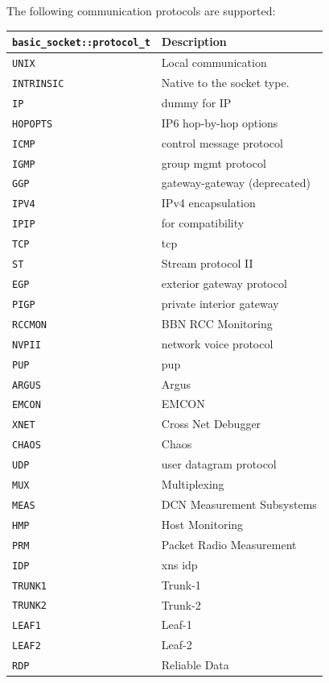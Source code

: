 \documentclass[10pt,a4paper,openany]{mudbook}
\begin{document}
The following communication protocols are supported:
\begin{longtable}{l|p{}}
  \textbf{\texttt{basic\_socket::protocol\_t}} & \textbf{Description}  \\
  \hline
  \texttt{UNIX} & Local communication  \\
  \texttt{INTRINSIC} & Native to the socket type. \\
  \texttt{IP} & dummy for IP \\
  \texttt{HOPOPTS} & IP6 hop-by-hop options \\
  \texttt{ICMP} & control message protocol \\
  \texttt{IGMP} & group mgmt protocol \\
  \texttt{GGP} & gateway-gateway (deprecated) \\
  \texttt{IPV4} & IPv4 encapsulation \\
  \texttt{IPIP} & for compatibility \\
  \texttt{TCP} & tcp \\
  \texttt{ST} & Stream protocol II \\
  \texttt{EGP} & exterior gateway protocol \\
  \texttt{PIGP} & private interior gateway \\
  \texttt{RCCMON} & BBN RCC Monitoring \\
  \texttt{NVPII} & network voice protocol \\
  \texttt{PUP} & pup \\
  \texttt{ARGUS} & Argus \\
  \texttt{EMCON} & EMCON \\
  \texttt{XNET} & Cross Net Debugger \\
  \texttt{CHAOS} & Chaos \\
  \texttt{UDP} & user datagram protocol \\
  \texttt{MUX} & Multiplexing \\
  \texttt{MEAS} & DCN Measurement Subsystems \\
  \texttt{HMP} & Host Monitoring \\
  \texttt{PRM} & Packet Radio Measurement \\
  \texttt{IDP} & xns idp \\
  \texttt{TRUNK1} & Trunk-1 \\
  \texttt{TRUNK2} & Trunk-2 \\
  \texttt{LEAF1} & Leaf-1 \\
  \texttt{LEAF2} & Leaf-2 \\
  \texttt{RDP} & Reliable Data \\

\end{longtable}
\end{document}
